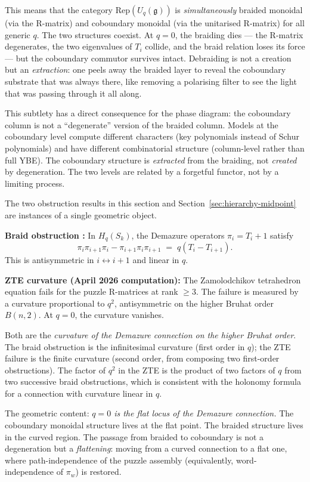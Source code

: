 This means that the category $\mathrm{Rep}(U_q(\mathfrak{g}))$ is
\emph{simultaneously} braided monoidal (via the R-matrix) and coboundary
monoidal (via the unitarised R-matrix) for all generic $q$.  The two
structures coexist.  At $q = 0$, the braiding dies --- the R-matrix
degenerates, the two eigenvalues of $T_i$ collide, and the braid
relation loses its force --- but the coboundary commutor survives
intact.  Debraiding is not a creation but an \emph{extraction}: one
peels away the braided layer to reveal the coboundary substrate that
was always there, like removing a polarising filter to see the light
that was passing through it all along.

\begin{remark}
This subtlety has a direct consequence for the phase diagram: the
coboundary column is not a ``degenerate'' version of the braided
column.  Models at the coboundary level compute different characters
(key polynomials instead of Schur polynomials) and have different
combinatorial structure (column-level rather than full YBE).  The
coboundary structure is \emph{extracted} from the braiding, not
\emph{created} by degeneration.  The two levels are related by a
forgetful functor, not by a limiting process.
\end{remark}

\begin{remark}
\label{rem:curvature-unification}
The two obstruction results in this section and Section~\ref{sec:hierarchy-midpoint}
are instances of a single geometric object.

\medskip\noindent
\textbf{Braid obstruction \cite{clio-midpoint-2026}:} In $H_q(S_k)$,
the Demazure operators $\pi_i = T_i + 1$ satisfy
\[
  \pi_i \pi_{i+1} \pi_i - \pi_{i+1} \pi_i \pi_{i+1}
  \;=\; q(T_i - T_{i+1}).
\]
This is antisymmetric in $i \leftrightarrow i+1$ and linear in $q$.

\medskip\noindent
\textbf{ZTE curvature (April 2026 computation):}
The Zamolodchikov tetrahedron equation fails for the puzzle R-matrices at rank $\geq 3$.
The failure is measured by a curvature proportional to $q^2$, antisymmetric on the
higher Bruhat order $B(n,2)$.  At $q = 0$, the curvature vanishes.

\medskip\noindent
Both are the \emph{curvature of the Demazure connection on the higher Bruhat order}.
The braid obstruction is the infinitesimal curvature (first order in $q$); the ZTE
failure is the finite curvature (second order, from composing two first-order
obstructions).  The factor of $q^2$ in the ZTE is the product of two factors of $q$
from two successive braid obstructions, which is consistent with the holonomy formula
for a connection with curvature linear in $q$.

The geometric content: \emph{$q = 0$ is the flat locus of the Demazure connection.}
The coboundary monoidal structure lives at the flat point.  The braided structure lives
in the curved region.  The passage from braided to coboundary is not a degeneration
but a \emph{flattening}: moving from a curved connection to a flat one, where
path-independence of the puzzle assembly (equivalently, word-independence of $\pi_w$)
is restored.
\end{remark}



